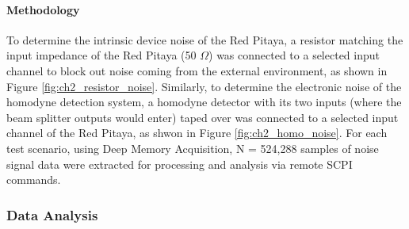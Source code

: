 \paragraph{Methodology}

To determine the intrinsic device noise of the Red Pitaya, a resistor matching the input impedance of the Red Pitaya (50 $\Omega$) was connected to a selected input channel to block out noise coming from the external environment, as shown in Figure \ref{fig:ch2_resistor_noise}. Similarly, to determine the electronic noise of the homodyne detection system, a homodyne detector with its two inputs (where the beam splitter outputs would enter) taped over was connected to a selected input channel of the Red Pitaya, as shwon in Figure \ref{fig:ch2_homo_noise}. For each test scenario, using Deep Memory Acquisition, N = 524,288 samples of noise signal data were extracted for processing and analysis via remote SCPI commands.

\subsubsection{Data Analysis}


